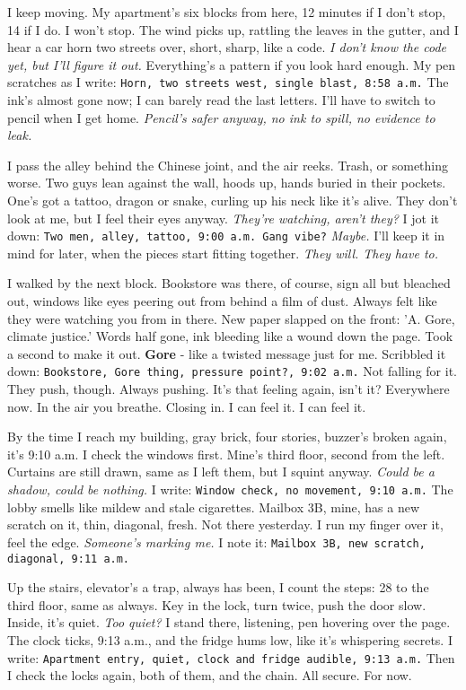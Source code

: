 \documentclass[12pt,oneside]{book} %
\newcommand{\note}[1]{\texttt{#1}}
\begin{document}
I keep moving. My apartment’s six blocks from here, 12 minutes if I don’t stop, 14 if I do. I won’t stop. The wind picks up, rattling the leaves in the gutter, and I hear a car horn two streets over, short, sharp, like a code. \textit{I don’t know the code yet, but I’ll figure it out.} Everything’s a pattern if you look hard enough. My pen scratches as I write: \note{Horn, two streets west, single blast, 8:58 a.m.} The ink’s almost gone now; I can barely read the last letters. I’ll have to switch to pencil when I get home. \textit{Pencil’s safer anyway, no ink to spill, no evidence to leak.}

I pass the alley behind the Chinese joint, and the air reeks. Trash, or something worse. Two guys lean against the wall, hoods up, hands buried in their pockets. One’s got a tattoo, dragon or snake, curling up his neck like it’s alive. They don’t look at me, but I feel their eyes anyway. \textit{They’re watching, aren’t they?} I jot it down: \note{Two men, alley, tattoo, 9:00 a.m. Gang vibe?} \textit{Maybe.} I’ll keep it in mind for later, when the pieces start fitting together. \textit{They will. They have to.}

I walked by the next block. Bookstore was there, of course, sign all but bleached out, windows like eyes peering out from behind a film of dust. Always felt like they were watching you from in there.  New paper slapped on the front: 'A. Gore, climate justice.' Words half gone, ink bleeding like a wound down the page. Took a second to make it out.  \textbf{Gore} - like a twisted message just for me.  Scribbled it down: \note{Bookstore, Gore thing, pressure point?, 9:02 a.m.}  Not falling for it.  They push, though.  Always pushing.  It's that feeling again, isn't it?  Everywhere now.  In the air you breathe. Closing in. I can feel it. I can feel it.

By the time I reach my building, gray brick, four stories, buzzer’s broken again, it’s 9:10 a.m. I check the windows first. Mine’s third floor, second from the left. Curtains are still drawn, same as I left them, but I squint anyway. \textit{Could be a shadow, could be nothing.} I write: \note{Window check, no movement, 9:10 a.m.} The lobby smells like mildew and stale cigarettes. Mailbox 3B, mine, has a new scratch on it, thin, diagonal, fresh. Not there yesterday. I run my finger over it, feel the edge. \textit{Someone’s marking me.} I note it: \note{Mailbox 3B, new scratch, diagonal, 9:11 a.m.}

Up the stairs, elevator’s a trap, always has been, I count the steps: 28 to the third floor, same as always. Key in the lock, turn twice, push the door slow. Inside, it’s quiet. \textit{Too quiet?} I stand there, listening, pen hovering over the page. The clock ticks, 9:13 a.m., and the fridge hums low, like it’s whispering secrets. I write: \note{Apartment entry, quiet, clock and fridge audible, 9:13 a.m.} Then I check the locks again, both of them, and the chain. All secure. For now.
\end{document}

